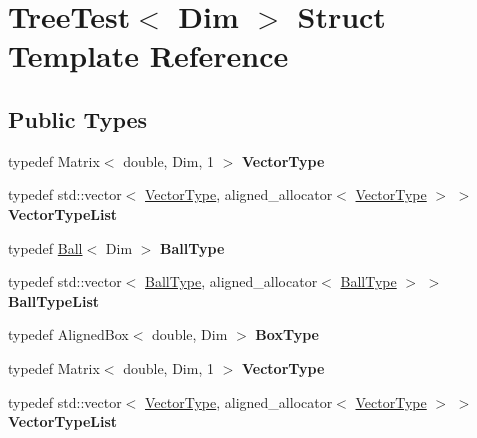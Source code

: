 \hypertarget{struct_tree_test}{}\section{Tree\+Test$<$ Dim $>$ Struct Template Reference}
\label{struct_tree_test}
\subsection*{Public Types}
\begin{DoxyCompactItemize}
\item 
\mbox{\label{struct_tree_test_a0e3a34390b2cdf94e1355ca61c50a098}} 
typedef Matrix$<$ double, Dim, 1 $>$ {\bfseries Vector\+Type}
\item 
\mbox{\label{struct_tree_test_a5bcf688e455923e3da6a023b2b8ea65f}} 
typedef std\+::vector$<$ \hyperlink{struct_vector_type}{Vector\+Type}, aligned\+\_\+allocator$<$ \hyperlink{struct_vector_type}{Vector\+Type} $>$ $>$ {\bfseries Vector\+Type\+List}
\item 
\mbox{\label{struct_tree_test_a38858d8e8591e5807d8d92338842e741}} 
typedef \hyperlink{struct_ball}{Ball}$<$ Dim $>$ {\bfseries Ball\+Type}
\item 
\mbox{\label{struct_tree_test_abf836427b2c6d69c71462728ce8ba8ff}} 
typedef std\+::vector$<$ \hyperlink{struct_ball}{Ball\+Type}, aligned\+\_\+allocator$<$ \hyperlink{struct_ball}{Ball\+Type} $>$ $>$ {\bfseries Ball\+Type\+List}
\item 
\mbox{\label{struct_tree_test_a508b077c034bd084702e6c97cfb1a095}} 
typedef Aligned\+Box$<$ double, Dim $>$ {\bfseries Box\+Type}
\item 
\mbox{\label{struct_tree_test_a0e3a34390b2cdf94e1355ca61c50a098}} 
typedef Matrix$<$ double, Dim, 1 $>$ {\bfseries Vector\+Type}
\item 
\mbox{\label{struct_tree_test_a5bcf688e455923e3da6a023b2b8ea65f}} 
typedef std\+::vector$<$ \hyperlink{struct_vector_type}{Vector\+Type}, aligned\+\_\+allocator$<$ \hyperlink{struct_vector_type}{Vector\+Type} $>$ $>$ {\bfseries Vector\+Type\+List}

\end{DoxyCompactItemize}
